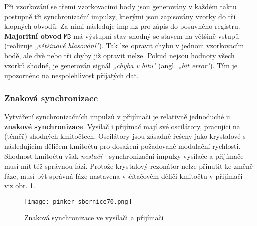         Při vzorkování se třemi vzorkovacími body jsou generovány v každém taktu postupně tři
        synchronizační impulzy, kterými jsou zapisovány vzorky do tří klopných obvodů. Za nimi
        následuje impulz pro zápis do posuvného registru. \textbf{Majoritní obvod} \texttt{M3} má
        výstupní stav shodný se stavem na většině vstupů (realizuje \emph{„většinové hlasování"}).
        Tak lze opravit chybu v jednom vzorkovacím bodě, ale dvě nebo tři chyby již opravit nelze.
        Pokud nejsou hodnoty všech vzorků shodné, je generován signál  \emph{„chyba v bitu"} (angl.
        \emph{„bit error"}). Tím je upozorněno na nespolehlivost přijatých dat.
        
        
      \subsubsection{Znaková synchronizace}\label{MIT:chap_znak_synchr}
        Vytváření synchronizačních impulzů v přijímači je relativně jednoduché u \textbf{znakové
        synchronizace}. Vysílač i přijímač mají své oscilátory, pracující na (téměř) shodných
        kmitočtech. Oscilátory jsou zásadně řešeny jako krystalové s následujícím děličem kmitočtu
        pro dosažení požadované modulační rychlosti. Shodnost kmitočtů však \emph{nestačí} -
        synchronizační impulzy vysílače a přijímače musí mít též správnou fázi. Protože krystalový
        rezonátor nelze přinutit ke změně fáze, musí být správná fáze nastavena v čítačovém děliči
        kmitočtu v přijímači - viz obr. \ref{MIT:fig_sbernice70}.
        
        \begin{figure}[ht!] %
          \centering
          \texttt{[image: pinker\_sbernice70.png]}
          \caption{Znaková synchronizace ve vysílači a přijímači}
          \label{MIT:fig_sbernice70}
        \end{figure}
        
